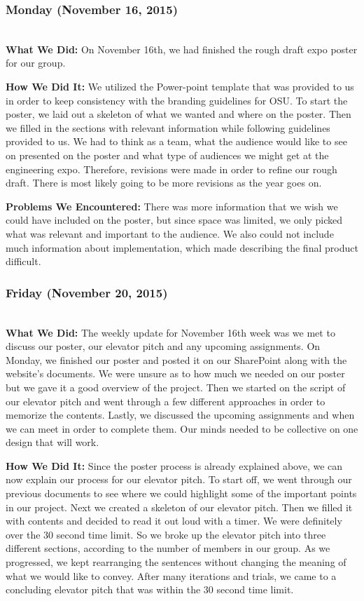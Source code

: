 \documentclass[onecolumn]{IEEEtran}
\begin{document}
\subsubsection{Monday (November 16, 2015)} \hspace*{\fill} \\  
    \textbf{What We Did: }
    On November 16th, we had finished the rough draft expo poster for our group.  
    
    \textbf{How We Did It: } 
    We utilized the Power-point template that was provided to us in order to keep consistency with the branding guidelines for OSU. To start the poster, we laid out a skeleton of what we wanted and where on the poster. Then we filled in the sections with relevant information while following guidelines provided to us. We had to think as a team, what the audience would like to see on presented on the poster and what type of audiences we might get at the engineering expo. Therefore, revisions were made in order to refine our rough draft. There is most likely going to be more revisions as the year goes on.  
    
    \textbf{Problems We Encountered: } 
    There was more information that we wish we could have included on the poster, but since space was limited, we only picked what was relevant and important to the audience. We also could not include much information about implementation, which made describing the final product difficult.  

\subsubsection{Friday (November 20, 2015)} \hspace*{\fill} \\  
    \textbf{What We Did: }
    The weekly update for November 16th week was we met to discuss our poster, our elevator pitch and any upcoming assignments. On Monday, we finished our poster and posted it on our SharePoint along with the website's documents. We were unsure as to how much we needed on our poster but we gave it a good overview of the project. Then we started on the script of our elevator pitch and went through a few different approaches in order to memorize the contents. Lastly, we discussed the upcoming assignments and when we can meet in order to complete them. Our minds needed to be collective on one design that will work.  
    
    \textbf{How We Did It: } 
    Since the poster process is already explained above, we can now explain our process for our elevator pitch. To start off, we went through our previous documents to see where we could highlight some of the important points in our project. Next we created a skeleton of our elevator pitch. Then we filled it with contents and decided to read it out loud with a timer. We were definitely over the 30 second time limit. So we broke up the elevator pitch into three different sections, according to the number of members in our group. As we progressed, we kept rearranging the sentences without changing the meaning of what we would like to convey. After many iterations and trials, we came to a concluding elevator pitch that was within the 30 second time limit.  
    
\end{document}
